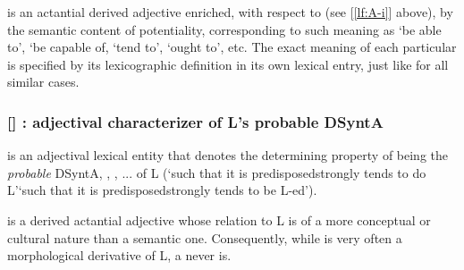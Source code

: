  is an actantial derived adjective enriched, with respect to  (see [\ref{lf:A-i}] above), by the semantic content of potentiality, corresponding to such meaning as `be able to', `be capable of, `tend to', `ought to', etc. The exact meaning of each particular  is specified by its lexicographic definition in its own lexical entry, just like for all similar cases.

\subsubsection*{{\small []}  : adjectival characterizer of L's probable DSyntA\thinspace{}}\label{lf:Qual-i}

 is an adjectival lexical entity that denotes the determining property of being the \emph{probable} DSyntA\thinspace{}, , , ... of L (`such that it is predisposed\slashs{}strongly tends to do L'\slashs`such that it is predisposed\slashs{}strongly tends to be L-ed').

 is a derived actantial adjective whose relation to L is of a more conceptual or cultural nature than a semantic one. Consequently, while  is very often a morphological derivative of L, a  never is.

